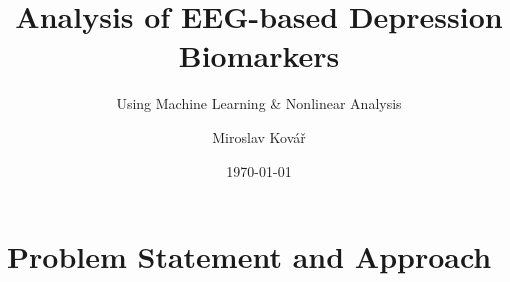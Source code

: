 \documentclass{beamer}
\title{Analysis of EEG-based Depression Biomarkers}
\subtitle{Using Machine Learning \& Nonlinear Analysis}
\author{Miroslav Kovář}
\institute{FJFI}
\date{\today}
\begin{document}

\begin{frame}
	\maketitle %
\end{frame}


\section{Problem Statement and Approach} 
\end{document}
